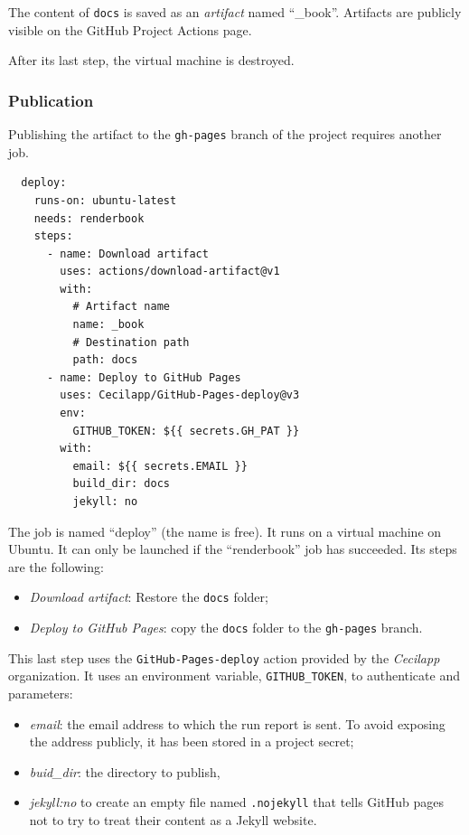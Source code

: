 \documentclass[
  12pt,
  american,
  a4paper,
  extrafontsizes,onecolumn,openright
  ]{memoir}
\providecommand{\tightlist}{%
  \setlength{\itemsep}{0pt}\setlength{\parskip}{0pt}}
\begin{document}
The content of \texttt{docs} is saved as an \emph{artifact} named ``\_book''.
Artifacts are publicly visible on the GitHub Project Actions page.

After its last step, the virtual machine is destroyed.

\hypertarget{publication}{%
\subsubsection{Publication}\label{publication}}

Publishing the artifact to the \texttt{gh-pages} branch of the project requires another job.

\begin{verbatim}
  deploy:
    runs-on: ubuntu-latest
    needs: renderbook
    steps:
      - name: Download artifact
        uses: actions/download-artifact@v1
        with:
          # Artifact name
          name: _book
          # Destination path
          path: docs
      - name: Deploy to GitHub Pages
        uses: Cecilapp/GitHub-Pages-deploy@v3
        env:
          GITHUB_TOKEN: ${{ secrets.GH_PAT }}
        with:
          email: ${{ secrets.EMAIL }}
          build_dir: docs
          jekyll: no
\end{verbatim}

The job is named \enquote{deploy} (the name is free).
It runs on a virtual machine on Ubuntu.
It can only be launched if the \enquote{renderbook} job has succeeded.
Its steps are the following:

\begin{itemize}
\tightlist
\item
  \emph{Download artifact}: Restore the \texttt{docs} folder;
\item
  \emph{Deploy to GitHub Pages}: copy the \texttt{docs} folder to the \texttt{gh-pages} branch.
\end{itemize}

This last step uses the \texttt{GitHub-Pages-deploy} action provided by the \emph{Cecilapp} organization.
It uses an environment variable, \texttt{GITHUB\_TOKEN}, to authenticate and parameters:

\begin{itemize}
\tightlist
\item
  \emph{email}: the email address to which the run report is sent.
  To avoid exposing the address publicly, it has been stored in a project secret;
\item
  \emph{buid\_dir}: the directory to publish,
\item
  \emph{jekyll:no} to create an empty file named \texttt{.nojekyll} that tells GitHub pages not to try to treat their content as a Jekyll website.
\end{itemize}
\end{document}
